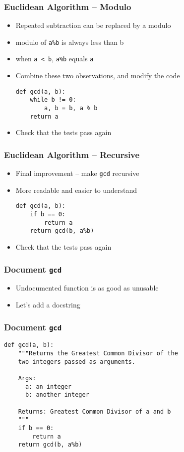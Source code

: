 \documentclass[14pt,compress]{beamer}
\begin{document}
\begin{frame}[fragile]
  \frametitle{Euclidean Algorithm -- Modulo}
  \begin{itemize}
  \item Repeated subtraction can be replaced by a modulo
  \item modulo of \texttt{a\%b} is always less than b
  \item when \texttt{a < b}, \texttt{a\%b} equals \texttt{a}
  \item Combine these two observations, and modify the code
\begin{lstlisting}
def gcd(a, b):
    while b != 0:
        a, b = b, a % b
    return a
\end{lstlisting}
  \item Check that the tests pass again
  \end{itemize}
\end{frame}

\begin{frame}[fragile]
  \frametitle{Euclidean Algorithm -- Recursive}
  \begin{itemize}
  \item Final improvement -- make \texttt{gcd} recursive
  \item More readable and easier to understand
\begin{lstlisting}
def gcd(a, b):
    if b == 0:
        return a
    return gcd(b, a%b)
\end{lstlisting}
  \item Check that the tests pass again
  \end{itemize}
\end{frame}

\begin{frame}[fragile]
  \frametitle{Document \texttt{gcd}}
  \begin{itemize}
  \item Undocumented function is as good as unusable
  \item Let's add a docstring
  \end{itemize}
\end{frame}
\begin{frame}[fragile]
  \frametitle{Document \texttt{gcd}}
\small
\begin{lstlisting}
def gcd(a, b):
    """Returns the Greatest Common Divisor of the
    two integers passed as arguments.

    Args:
      a: an integer
      b: another integer

    Returns: Greatest Common Divisor of a and b
    """
    if b == 0:
        return a
    return gcd(b, a%b)
\end{lstlisting}
\end{frame}
\end{document}
